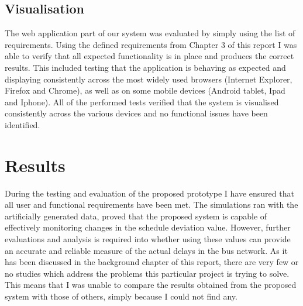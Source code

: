 \subsection{Visualisation}
The web application part of our system was evaluated by simply using the list of requirements. Using the defined requirements from Chapter 3 of this report I was able to verify that all expected functionality is in place and produces the correct results. This included testing that the application is behaving as expected and displaying consistently across the most widely used browsers (Internet Explorer, Firefox and Chrome), as well as on some mobile devices (Android tablet, Ipad and Iphone). All of the performed tests verified that the system is visualised consistently across the various devices and no functional issues have been identified.

\section{Results}
During the testing and evaluation of the proposed prototype I have ensured that all user and functional requirements have been met. The simulations ran with the artificially generated data, proved that the proposed system is capable of effectively monitoring changes in the schedule deviation value. However, further evaluations and analysis is required into whether using these values can provide an accurate and reliable measure of the actual delays in the bus network. As it has been discussed in the background chapter of this report, there are very few or no studies which address the problems this particular project is trying to solve. This means that I was unable to compare the results obtained from the proposed system with those of others, simply because I could not find any. 




